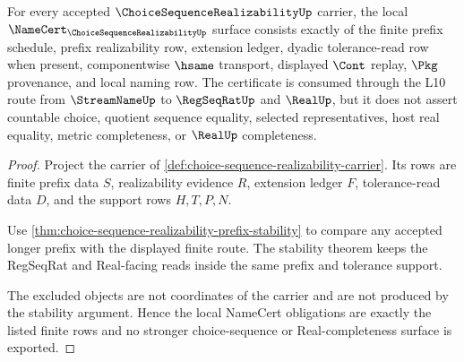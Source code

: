\begin{theorem}
\label{thm:choice-sequence-realizability-namecert-obligations}
For every accepted $\ChoiceSequenceRealizabilityUp$ carrier, the local $\NameCert_{\ChoiceSequenceRealizabilityUp}$ surface consists exactly of the finite prefix schedule, prefix realizability row, extension ledger, dyadic tolerance-read row when present, componentwise $\hsame$ transport, displayed $\Cont$ replay, $\Pkg$ provenance, and local naming row. The certificate is consumed through the L10 route from $\StreamNameUp$ to $\RegSeqRatUp$ and $\RealUp$, but it does not assert countable choice, quotient sequence equality, selected representatives, host real equality, metric completeness, or $\RealUp$ completeness.
\end{theorem}
\begin{proof}
Project the carrier of \autoref{def:choice-sequence-realizability-carrier}. Its rows are finite prefix data $S$, realizability evidence $R$, extension ledger $F$, tolerance-read data $D$, and the support rows $H,T,P,N$.

Use \autoref{thm:choice-sequence-realizability-prefix-stability} to compare any accepted longer prefix with the displayed finite route. The stability theorem keeps the RegSeqRat and Real-facing reads inside the same prefix and tolerance support.

The excluded objects are not coordinates of the carrier and are not produced by the stability argument. Hence the local NameCert obligations are exactly the listed finite rows and no stronger choice-sequence or Real-completeness surface is exported.
\end{proof}


\begin{closurestatus}{\ChoiceSequenceRealizabilityUp}
  \theoryclosure{\seedClosure}
  \formalstatus{\unformalizedV}
\end{closurestatus}
